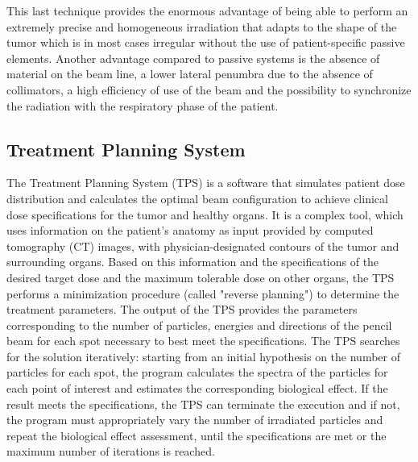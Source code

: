 \noindent This last technique provides the enormous advantage of being able to perform an extremely precise and homogeneous irradiation that adapts to the shape of the tumor which is in most cases irregular without the use of patient-specific passive elements.
Another advantage compared to passive systems is the absence of material on the beam line, a lower lateral penumbra due to the absence of collimators, a high efficiency of use of the beam and the possibility to synchronize the radiation with the respiratory phase of the patient.

\subsection{Treatment Planning System}
\noindent The Treatment Planning System (TPS) is a software that simulates patient dose distribution and calculates the optimal beam configuration to achieve clinical dose specifications for the tumor and healthy organs.
It is a complex tool, which uses information on the patient's anatomy as input provided by computed tomography (CT) images, with physician-designated contours of the tumor and surrounding organs.
Based on this information and the specifications of the desired target dose and the maximum tolerable dose on other organs, the TPS performs a minimization procedure (called "reverse planning") to determine the treatment parameters.
The output of the TPS provides the parameters corresponding to the number of particles, energies and directions of the pencil beam for each spot necessary to best meet the specifications.
The TPS searches for the solution iteratively: starting from an initial hypothesis on the number of particles for each spot, the program calculates the spectra of the particles for each point of interest and estimates the corresponding biological effect.
If the result meets the specifications, the TPS can terminate the execution and if not, the program must appropriately vary the number of irradiated particles and repeat the biological effect assessment, until the specifications are met or the maximum number of iterations is reached.


